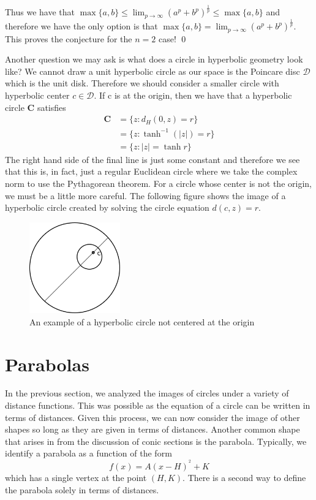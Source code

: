 \documentclass[a4paper, 12pt]{article}
\begin{document}
  Thus we have that $\max\{a,b\}\leq \lim_{p\to\infty}(a^p+b^p)^{\frac{1}{p}} \leq \max\{a,b\}$ and therefore we have the only option is that $\max\{a,b\} = \lim_{p\to\infty}(a^p+b^p)^{\frac{1}{p}}$. This proves the conjecture for the $n=2$ case! \qed

  Another question we may ask is what does a circle in hyperbolic geometry look like? We cannot draw a unit hyperbolic circle as our space is the Poincare disc $\mathcal{D}$ which is the unit disk. Therefore we should consider a smaller circle with hyperbolic center $c\in\mathcal{D}$. If c is at the origin, then we have that a hyperbolic circle $\mathbf{C}$ satisfies
  \begin{align*}
    \mathbf{C} &= \{z: d_H(0,z) = r\} \\
    &= \{z: \tanh^{-1}(|z|) = r\}\\
    &= \{z: |z| = \tanh r \}
  \end{align*}
  The right hand side of the final line is just some constant and therefore we see that this is, in fact, just a regular Euclidean circle where we take the complex norm to use the Pythagorean theorem. For a circle whose center is not the origin, we must be a little more careful. The following figure shows the image of a hyperbolic circle created by solving the circle equation $d(c,z)=r$.  
  \begin{figure}[!hbt]
    \centering
    \includegraphics[width=0.35\textwidth]{hyperbolicCircle}
    \caption{An example of a hyperbolic circle not centered at the origin}
    \label{fig:hyperbolicCircle}
  \end{figure}


\section*{Parabolas}
In the previous section, we analyzed the images of circles under a variety of distance functions. This was possible as the equation of a circle can be written in terms of distances. Given this process, we can now consider the image of other shapes so long as they are given in terms of distances. Another common shape that arises in from the discussion of conic sections is the parabola. Typically, we identify a parabola as a function of the form
\begin{equation*}
  f(x) = A(x-H)^^2+K
\end{equation*}
which has a single vertex at the point $(H,K)$. There is a second way to define the parabola solely in terms of distances.
\end{document}
